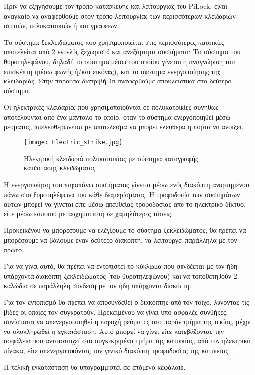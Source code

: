 \label{ch:unlock_mechanism}
Πριν να εξηγήσουμε τον τρόπο κατασκευής και λειτουργίας του PiLock, είναι αναγκαίο να αναφερθούμε στον τρόπο λειτουργίας των περισσότερων κλειδαριών σπιτιών, πολυκατοικιών ή και γραφείων.

Το σύστημα ξεκλειδώματος που χρησιμοποιείται στις περισσότερες κατοικίες αποτελείται από 2 εντελός ξεχωριστά και ανεξάρτητα συστήματα: Το σύστημα του θυροτηλεφώνου, δηλαδή το σύστημα μέσω του οποίου γίνεται η αναγνώριση του επισκέπτη (μέσω φωνής ή/και εικόνας), και το σύστημα ενεργοποίησης της κλειδαριάς. Στην παρούσα διατριβή θα αναφερθούμε αποκλειστικά στο δεύτερο σύστημα.

Οι ηλεκτρικές κλειδαριές που χρησιμοποιούνται σε πολυκατοικίες συνήθως αποτελούνται από ένα μάνταλο το οποίο, όταν το σύστημα ενεργοποιηθεί μέσω ρεύματος, απελευθερώνεται με αποτέλεσμα να μπορεί ελεύθερα η πόρτα να ανοίξει.

\begin{figure}[h]
	\centering
		\texttt{[image: Electric\_strike.jpg]}
	\caption{Ηλεκτρική κλειδαριά πολυκατοικίας με σύστημα καταγραφής κατάστασης κλειδώματος}
\end{figure}

Η ενεργοποίηση του παραπάνω συστήματος γίνεται μέσω ενός διακόπτη αναρτημένου πάνω στο θυροτηλέφωνο του κάθε διαμερίσματος. Η τροφοδοσία των συστημάτων αυτών μπορεί να γίνεται είτε μέσω απευθείας τροφοδοσίας από το ηλεκτρικό δίκτυο, είτε μέσω κάποιου μετασχηματιστή σε χαμηλότερες τάσεις.

Προκεικένου να μπορέσουμε να ελέγξουμε το σύστημα ξεκλειδώματος, θα πρέπει να μπορέσουμε να βάλουμε έναν δεύτερο διακόπτη, να λειτουργεί παράλληλα με τον πρώτο.  %

Για να γίνει αυτό, θα πρέπει να εντοπιστεί το κύκλωμα που συνδέεται με τον ήδη υπάρχοντα διακόπτη ξεκλειδώματος (του θυροτηλεφώνου) και να τοποθετηθούν 2 καλώδια σε παράλληλη σύνδεση με τον ήδη υπάρχοντα διακόπτη.

Για τον εντοπισμό θα πρέπει να αποσυνδεθεί ο διακόπτης από τον τοίχο, λύνοντας τις βίδες οι οποίες τον συγκρατούν. Προκειμένου να γίνει υπο ασφαλές συνθήκες, συνίσταται να απενεργοποιηθεί η παροχή ρεύματος στο παρόν τμήμα της οικίας, μέχρι να ολοκληρωθεί η εγκατάσταση. Αυτό μπορεί να γίνει είτε κατεβάζοντας την ασφάλεια που αντοιστοιχεί στο συγκεκριμένο τμήμα της κατοικίας, από τον ηλεκτρικό πίνακα, είτε απενεργοποιόντας τον γενικό διακόπτη τροφοδοσίας της κατοικίας.

Η τελική εγκατάσταση θα υπογραμμιστεί σε επόμενο κεφάλαιο.